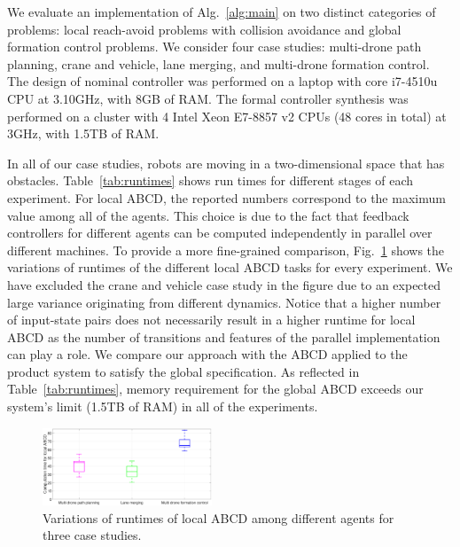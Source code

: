 We evaluate an implementation of Alg.~\ref{alg:main}
on two distinct categories of problems: 
local reach-avoid problems with collision avoidance and global formation control problems. 
We consider four case studies: multi-drone path planning, crane and vehicle, lane merging, and multi-drone formation control. 
The design of nominal controller was performed on a laptop with core i7-4510u CPU at 3.10GHz, with 8GB of RAM.
The formal controller synthesis was performed on a cluster with 4 Intel Xeon E7-8857 v2 CPUs (48 cores in total) at 3GHz, with 1.5TB of RAM. 

In all of our case studies, robots are moving in a two-dimensional space that has obstacles. 
Table~\ref{tab:runtimes} shows run times for different stages of each experiment. 
For local ABCD, the reported numbers correspond to the maximum value among all of the agents. 
This choice is due to the fact that feedback controllers for different agents can be computed independently 
in parallel over different machines. 
To provide a more fine-grained comparison,
Fig.~\ref{fig:box_plot} shows the variations of runtimes of the different local ABCD tasks for every experiment. 
We have excluded the crane and vehicle case study in the figure due to an expected large variance originating from different dynamics.
Notice that a higher number of input-state pairs does not necessarily result in a higher runtime for local ABCD as the 
number of transitions and features of the parallel implementation can play a role. 
%
We compare our approach with the ABCD applied to the product system to satisfy the global specification. 
As reflected in Table~\ref{tab:runtimes}, memory requirement for the global ABCD exceeds our system's limit (1.5TB of RAM) in all of the experiments.
%

\begin{figure}[t]
	\centering
	\includegraphics[width=0.45\textwidth]{figures/boxPlot2.eps}
	\caption{Variations of runtimes of local ABCD among different agents for three case studies.}
	\label{fig:box_plot}
\end{figure}

